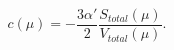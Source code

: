 \begin{equation}
c(\mu) = -\frac{3\alpha'}2\frac{S_{total}(\mu)}{V_{total}(\mu)}.
   \label{totalC}
\end{equation}

